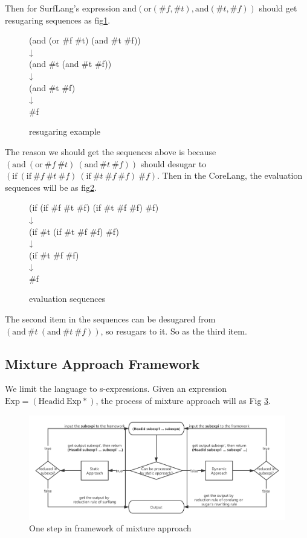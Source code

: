 Then for SurfLang's expression $\mbox{and}(\mbox{or}(\#f, \#t), \mbox{and}(\#t, \#f))$ should get resugaring sequences as fig\ref{fig:example}.

\begin{figure}[ht]
\parbox[t]{\textwidth}{
			\begin{center}  
				(and (or \#f \#t) (and \#t \#f))\\
				↓\\
				(and \#t (and \#t \#f))\\
				↓\\
				(and \#t \#f)\\
				↓\\
				\#f
			\end{center}  
		}
\caption{resugaring example}
\label{fig:example}
\end{figure}

The reason we should get the sequences above is because $(\mbox{and}~(\mbox{or}~\#f~\#t)~(\mbox{and}~\#t~\#f))$ should desugar to $(\mbox{if}~(\mbox{if}~\#f~\#t~\#f)~(\mbox{if}~\#t~\#f~\#f)~\#f)$. Then in the CoreLang, the evaluation sequences will be as fig\ref{fig:coreseq}.

\begin{figure}[ht]
\parbox[t]{\textwidth}{
			\begin{center}  
				(if (if \#f \#t \#f) (if \#t \#f \#f) \#f)\\
				↓\\
				(if \#t (if \#t \#f \#f) \#f)\\
				↓\\
				(if \#t \#f \#f)\\
				↓\\
				\#f
			\end{center}  
		}
\caption{evaluation sequences}
\label{fig:coreseq}
\end{figure}

The second item in the sequences can be desugared from $(\mbox{and}~\#t~(\mbox{and}~\#t~\#f))$, so resugars to it. So as the third item.

\subsection{Mixture Approach Framework}
We limit the language to s-expressions. Given an expression $\mbox{Exp} = (\mbox{Headid}~\mbox{Exp}*)$, the process of mixture approach will as Fig \ref{fig:mixture}.

\begin{figure}[t]
	\centering
	\includegraphics[width=12cm]{images/mixture.png}
	\caption{One step in framework of mixture approach}
	\label{fig:mixture}
\end{figure}

